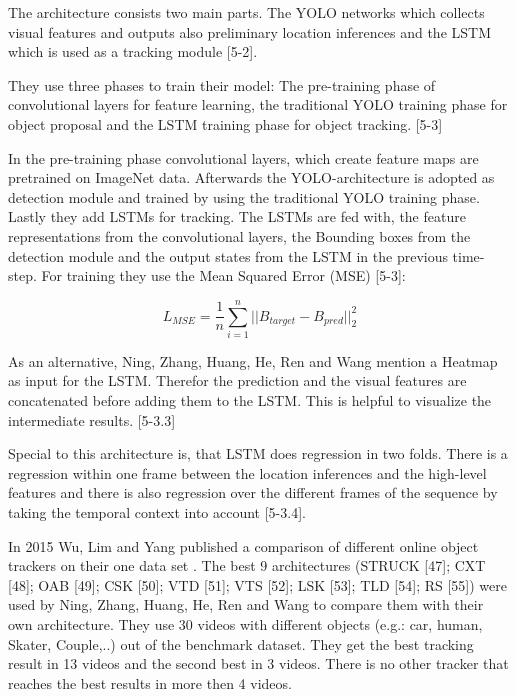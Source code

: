 \documentclass[conference]{IEEEtran}
\begin{document}
The architecture consists two main parts. The YOLO\cite{b26} networks which collects visual features and outputs also preliminary location inferences and the LSTM which is used as a tracking module [5-2]. \newline 

They use three phases to train their model: The pre-training phase of  convolutional layers for feature learning, the traditional YOLO training phase for object proposal and the LSTM training phase for object tracking. [5-3]  \newline

In the pre-training phase convolutional layers, which create feature maps are pretrained on ImageNet data. Afterwards the YOLO-architecture is adopted as detection module and trained by using the traditional YOLO training phase. Lastly they add LSTMs for tracking. The LSTMs are fed with, the feature representations from the convolutional layers, the Bounding boxes from the detection module and the output states from the LSTM in the previous time-step. For training they use the Mean Squared Error (MSE) [5-3]: \newline

\[ L_{MSE} = \dfrac{1}{n} \sum_{i = 1}^n ||B_{target}-B_{pred}||_{2}^2 \] \newline

As an alternative, Ning, Zhang, Huang, He, Ren and Wang mention a Heatmap as  input for the LSTM. Therefor the prediction and the visual features are concatenated before adding them to the LSTM. This is helpful to visualize the intermediate results. [5-3.3] \newline

Special to this architecture is, that LSTM does regression in two folds. There is a regression within one frame between the location inferences and the high-level features and there is also regression over the different frames of the sequence by taking the temporal context into account [5-3.4].  \newline

In 2015 Wu, Lim and Yang published a comparison of different online object trackers on their one data set \cite{b28}. The best 9 architectures (STRUCK [47]; CXT [48]; OAB [49]; CSK [50]; VTD [51]; VTS [52]; LSK [53]; TLD [54]; RS [55]) were used by Ning, Zhang, Huang, He, Ren and Wang to compare them with their own architecture. They use 30 videos with different objects (e.g.: car, human, Skater, Couple,..) out of the benchmark \cite{b28} dataset. They get the best tracking result in 13 videos and the second best in 3 videos. There is no other tracker that reaches the best results in more then 4 videos. \newline
\end{document}
